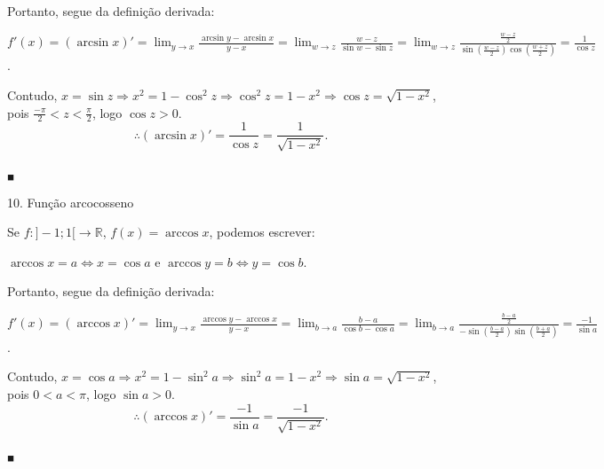 \documentclass{article}
\begin{document}
{\begin{newpage}
\vspace{0.3cm}
\par Portanto, segue da definição derivada:
\par $f'(x)=(\arcsin{x})'=\displaystyle{\lim_{y\to x}} \frac{\arcsin{y} - \arcsin{x}}{y-x}=\displaystyle{\lim_{w\to z}} \frac{w-z}{\sin{w} - \sin{z}} = \displaystyle{\lim_{w\to z}} \frac{\frac{w-z}{2}}{\sin{(\frac{w-z}{2})}\cos{(\frac{w+z}{2})}} = \frac{1}{\cos{z}}$.
\vspace{0.3cm}
\par Contudo, $x=\sin{z}\Rightarrow x^2=1-\cos^2{z}\Rightarrow \cos^2{z}=1-x^2\Rightarrow \cos{z}=\sqrt{1-x^2}$, pois $\displaystyle{\frac{-\pi }{2}} < z < \displaystyle{\frac{\pi }{2}}$, logo $\cos{z} > 0$.
\vspace{0.3cm}
$$\therefore (\arcsin{x})'=\frac{1}{\cos{z}}=\frac{1}{\sqrt{1-x^2}}.$$\begin{flushright} $_{\blacksquare }$ \end{flushright}
\par
\vspace{0.3cm}
\begin{flushleft}
10. Função arcocosseno
\end{flushleft}
\par Se $f:]-1;1[\rightarrow\mathbb{R}$, $f(x)=\arccos{x}$, podemos escrever:
\par \begin{center} $\arccos{x}=a\Leftrightarrow x=\cos{a}$ e $\arccos{y}=b\Leftrightarrow y=\cos{b}$.\end{center}
\vspace{0.3cm}
\par Portanto, segue da definição derivada:
\par $f'(x)=(\arccos{x})'=\displaystyle{\lim_{y\to x}} \frac{\arccos{y} - \arccos{x}}{y-x}=\displaystyle{\lim_{b\to a}} \frac{b-a}{\cos{b} - \cos{a}} = \displaystyle{\lim_{b\to a}} \frac{\frac{b-a}{2}}{-\sin{(\frac{b-a}{2})}\sin{(\frac{b+a}{2})}} = \frac{-1}{\sin{a}}$.
\vspace{0.3cm}
\par Contudo, $x=\cos{a}\Rightarrow x^2=1-\sin^2{a}\Rightarrow \sin^2{a}=1-x^2\Rightarrow \sin{a}=\sqrt{1-x^2}$, pois $0 < a < \pi$, logo $\sin{a}> 0$.
\vspace{0.3cm}
$$\therefore (\arccos{x})'=\frac{-1}{\sin{a}}=\frac{-1}{\sqrt{1-x^2}}.$$
\begin{flushright} $_{\blacksquare }$ \end{flushright}
\par

\end{newpage}}
\end{document}
